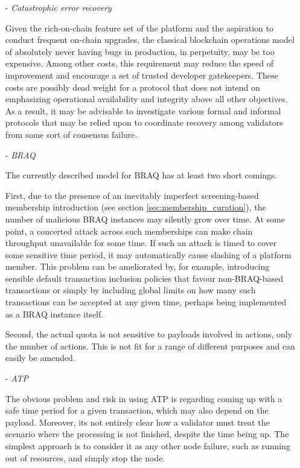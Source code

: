 \documentclass{article}
\begin{document}
\begin{itemize}

    \item[-] \textit{Catastrophic error recovery}

    Given the rich-on-chain feature set of the platform and the aspiration to conduct frequent on-chain upgrades, the classical blockchain operations model of absolutely never having bugs in production, in perpetuity, may be too expensive. Among other costs, this requirement may reduce the speed of improvement and encourage a set of trusted developer gatekeepers. These costs are possibly dead weight for a protocol that does not intend on emphasizing operational availability and integrity above all other objectives. As a result, it may be advisable to investigate various formal and informal protocols that may be relied upon to coordinate recovery among validators from some sort of consensus failure.

    \item[-] \textit{BRAQ}

    The currently described model for BRAQ has at least two short comings.

    First, due to the presence of an inevitably imperfect screening-based membership introduction (see section \ref{sec:membership_curation}), the number of malicious BRAQ instances may silently grow over time. At some point, a concerted attack across such memberships can make chain throughput unavailable for some time. If such an attack is timed to cover some sensitive time period, it may  automatically cause slashing of a platform member. This problem can be ameliorated by, for example, introducing sensible default transaction inclusion policies that favour non-BRAQ-based transactions or simply by including global limits on how many such transactions can be accepted at any given time, perhaps being implemented as a BRAQ instance itself.

    Second, the actual quota is not sensitive to payloads involved in actions, only the number of actions. This is not fit for a range of different purposes and can easily be amended.

    \item[-] \textit{ATP}

    The obvious problem and risk in using ATP is regarding coming up with a safe time period for a given transaction, which may also depend on the payload. Moreover, its not entirely clear how a validator must treat the scenario where the processing is not finished, despite the time being up. The simplest approach is to consider it as any other node failure, such as running out of resources, and simply stop the node.


\end{itemize}
\end{document}
